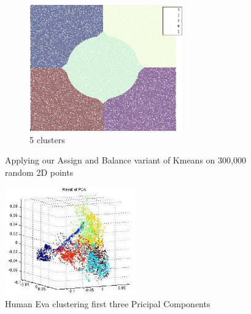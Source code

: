 \begin{appendices}
 \begin{figure}[h!]
 \centering
\begin{subfigure}[b]{0.5\textwidth}
\includegraphics[width=6.6cm]{Ekmeans5.png}
  \caption{5 clusters}
\end{subfigure}
\caption{Applying our Assign and Balance variant of Kmeans on 300,000 random 2D points}
\label{fig:ekmeans}
\end{figure}
\begin{figure}[h!]
\centering
 \includegraphics[width=0.5\textwidth]{HumanEVAPCAVis.jpg}
\caption{Human Eva clustering first three Pricipal Components }
\label{fig:hevaVis3}
\end{figure}







\end{appendices}
